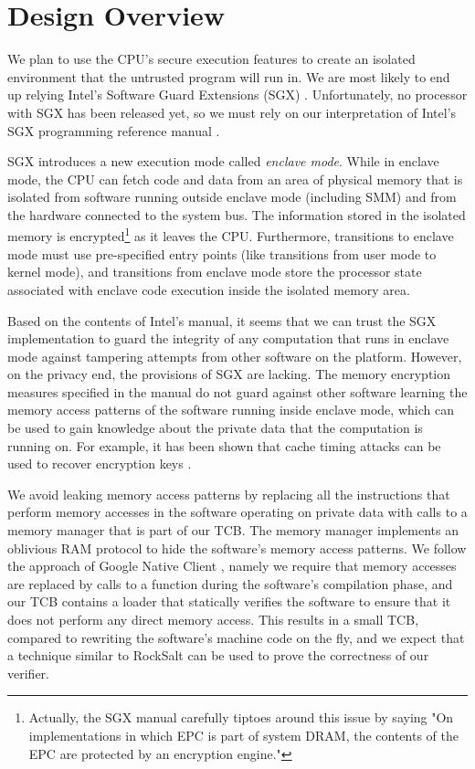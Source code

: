 \section{Design Overview}
\label{sec:overview}

We plan to use the CPU's secure execution features to create an isolated
environment that the untrusted program will run in. We are most likely to end
up relying Intel's Software Guard Extensions (SGX) \cite{anati2013sgx}.
Unfortunately, no processor with SGX has been released yet, so we must rely on
our interpretation of Intel's SGX programming reference manual
\cite{intel2013sgxmanual}.

SGX introduces a new execution mode called \textit{enclave mode}. While in
enclave mode, the CPU can fetch code and data from an area of physical memory
that is isolated from software running outside enclave mode (including SMM) and
from the hardware connected to the system bus. The information stored in the
isolated memory is encrypted\footnote{Actually, the SGX manual carefully
tiptoes around this issue by saying "On implementations in which EPC is part of
system DRAM, the contents of the EPC are protected by an encryption engine."}
as it leaves the CPU. Furthermore, transitions to enclave mode must use
pre-specified entry points (like transitions from user mode to kernel mode),
and transitions from enclave mode store the processor state associated with
enclave code execution inside the isolated memory area.

Based on the contents of Intel's manual, it seems that we can trust the SGX
implementation to guard the integrity of any computation that runs in enclave
mode against tampering attempts from other software on the platform. However,
on the privacy end, the provisions of SGX are lacking. The memory encryption
measures specified in the manual do not guard against other software learning
the memory access patterns of the software running inside enclave mode, which
can be used to gain knowledge about the private data that the computation is
running on. For example, it has been shown that cache timing attacks can be
used to recover encryption keys \cite{bonneau2006cache}
\cite{brumley2005remote} \cite{kocher1996timing}.

We avoid leaking memory access patterns by replacing all the instructions that
perform memory accesses in the software operating on private data with calls
to a memory manager that is part of our TCB. The memory manager implements an
oblivious RAM protocol \cite{stefanov2012path} to hide the software's memory
access patterns. We follow the approach of Google Native Client
\cite{yee2009native} \cite{sehr2010adapting}, namely we require that memory
accesses are replaced by calls to a function during the software's compilation
phase, and our TCB contains a loader that statically verifies the software to
ensure that it does not perform any direct memory access. This results in a
small TCB, compared to rewriting the software's machine code on the fly, and
we expect that a technique similar to RockSalt \cite{morrisett2012rocksalt} can
be used to prove the correctness of our verifier.

